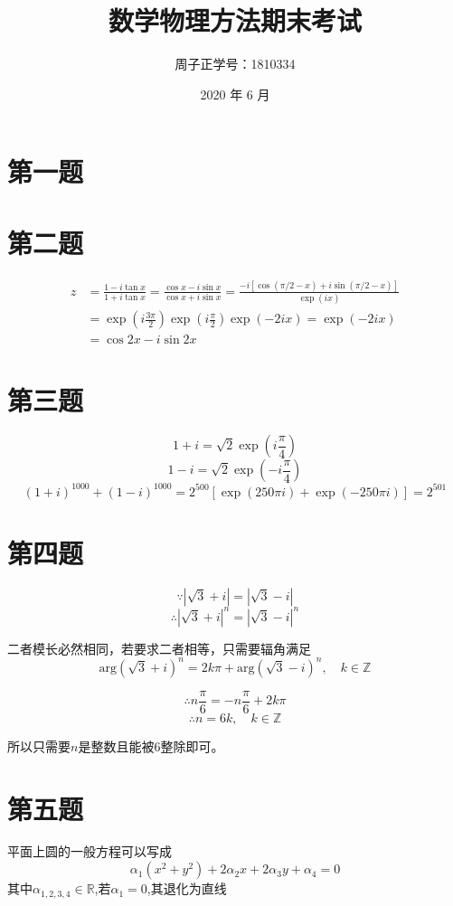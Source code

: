 \documentclass[a4paper]{ctexart}
\title{数学物理方法\quad 期末考试}
\author{周子正\quad 学号：1810334}
\date{2020 年 6 月}
\begin{document}
\maketitle
\section{第一题}

\section{第二题}

$$
    \begin{aligned}
        z & =\frac{1-i\tan x}{1+i\tan x}=\frac{\cos x-i\sin x}{\cos x+i\sin x}=\frac{-i\left[ \cos \left( \pi /2-x \right) +i\sin \left( \pi /2-x \right) \right]}{\exp \left( ix \right)} \\
          & =\exp \left( i\frac{3\pi}{2} \right) \exp \left( i\frac{\pi}{2} \right) \exp \left( -2ix \right) =\exp \left( -2ix \right)                                                     \\
          & =\cos 2x-i\sin 2x
    \end{aligned}
$$


\section{第三题}

$$
    1+i=\sqrt{2}\exp \left( i\frac{\pi}{4} \right)
$$
$$
    1-i=\sqrt{2}\exp \left( -i\frac{\pi}{4} \right)
$$
$$
    \left( 1+i \right) ^{1000}+\left( 1-i \right) ^{1000}=2^{500}\left[ \exp \left( 250\pi i \right) +\exp \left( -250\pi i \right) \right] =2^{501}
$$


\section{第四题}

$$
    \because |\sqrt{3}+i|=|\sqrt{3}-i|
$$
$$
    \therefore |\sqrt{3}+i|^n=|\sqrt{3}-i|^n
$$

二者模长必然相同，若要求二者相等，只需要辐角满足
$$
    \text{arg}\left( \sqrt{3}+i \right) ^n=2k\pi +\text{arg}\left( \sqrt{3}-i \right) ^n,\quad k\in \mathbb{Z}
$$

$$
    \therefore n\frac{\pi}{6}=-n\frac{\pi}{6}+2k\pi
$$
$$
    \therefore n=6k,\quad k\in \mathbb{Z}
$$

所以只需要$n$是整数且能被$6$整除即可。

\section{第五题}
平面上圆的一般方程可以写成
$$
    \alpha _1\left( x^2+y^2 \right) +2\alpha _2x+2\alpha _3y+\alpha _4=0
$$
其中$\alpha_{1,2,3,4}\in\mathbb{R}$,若$\alpha_1=0$,其退化为直线
\end{document}
